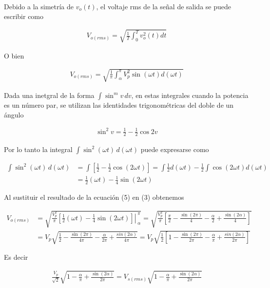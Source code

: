 \documentclass{article}
\begin{document}
	\noindent Debido a la simetría de $v_o(t)$, el voltaje rms de la señal de salida se puede escribir como
	
	\begin{align}
		V_{o(rms)} = \sqrt{\frac{1}{T} \int_{0}^{T}v_o^2 (t) dt}
	\end{align}
	
	\noindent O bien
	
	\begin{align}
		V_{o(rms)} = \sqrt{\frac{1}{\pi} \int_{\alpha}^{\pi}V_p^2 \sin (\omega t) d(\omega t)}
	\end{align}
	
	\noindent Dada una inetgral de la forma $\int {\sin^m v \, dv}$, en estas integrales cuando la potencia es un número par, se utilizan las identidades trigonométricas del doble de un ángulo
	
	\begin{align}
		\sin^2 v = \frac{1}{2} - \frac{1}{2} \cos 2v 
	\end{align} 
	
	\noindent Por lo tanto la integral $\int \sin ^2 (\omega t) \, d (\omega t)$ puede expresarse como
	
	\begin{align}
		\int \sin ^2 (\omega t) \, d (\omega t) &= \int  \left[ \frac{1}{2} - \frac{1}{2} \cos (2\omega t) \right] = \int {\frac{1}{2} d(\omega t) - \frac{1}{2} \int {\cos (2\omega t) d(\omega t)}  } \nonumber\\
		&= \frac{1}{2} (\omega t) - \frac{1}{4}\sin(2 \omega t)
	\end{align}
	
	\noindent Al sustituir el resultado de la ecuación (5) en (3) obtenemos
	
	\begin{align}
			V_{o(rms)} &= \sqrt{\frac{V_p^2}{\pi} \left.{\left[ \frac{1}{2} (\omega t) -  \frac{1}{4} \sin (2\omega t) \right]}\right|_{\;\alpha}^{\;\pi}} = \sqrt{\frac{V_p^2}{\pi} \left[ \frac{\pi}{2} - \frac{\sin (2\pi)}{4} - \frac{\alpha}{2}  + \frac{\sin (2 \alpha)}{4}\right]} \nonumber \\
			&= V_p \sqrt{ \frac{1}{2} - \frac{\sin (2 \pi)}{4 \pi} - \frac{\alpha}{2 \pi} + \frac{sin (2\alpha)}{4 \pi} } = V_p \sqrt{ \frac{1}{2} \left[1 - \frac{\sin (2 \pi)}{2 \pi} - \frac{\alpha}{\pi} + \frac{sin (2\alpha)}{2 \pi} \right]  } \nonumber
	\end{align}
	
	Es decir
	
	\begin{align}
		\frac{V_p}{\sqrt{2}} \sqrt{1 - \frac{\alpha}{\pi} + \frac{\sin (2 \alpha)}{2 \pi}} = V_{s(rms)} \sqrt{1 - \frac{\alpha}{\pi} + \frac{\sin (2 \alpha)}{2 \pi}}
	\end{align}
\end{document}
